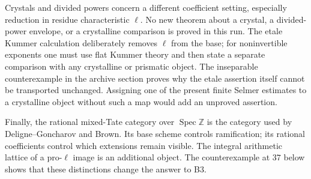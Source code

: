 Crystals and divided powers concern a different coefficient setting,
especially reduction in residue characteristic $\ell$. No new theorem
about a crystal, a divided-power envelope, or a crystalline comparison
is proved in this run. The etale Kummer calculation deliberately removes
$\ell$ from the base; for noninvertible exponents one must use flat
Kummer theory and then state a separate comparison with any crystalline
or prismatic object. The inseparable counterexample in the archive
section proves why the etale assertion itself cannot be transported
unchanged. Assigning one of the present finite Selmer estimates to a
crystalline object without such a map would add an unproved assertion.

Finally, the rational mixed-Tate category over $\operatorname{Spec}
\mathbb Z$ is the category used by Deligne--Goncharov and Brown. Its
base scheme controls ramification; its rational coefficients control
which extensions remain visible. The integral arithmetic lattice of a
pro-$\ell$ image is an additional object. The counterexample at $37$
below shows that these distinctions change the answer to B3.

